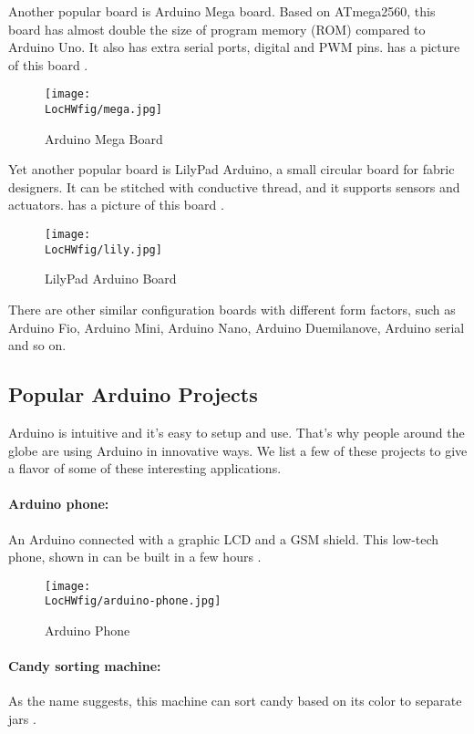 Another popular board is Arduino Mega board.  Based on
ATmega2560, this board has almost double the size of program
memory (ROM) compared to Arduino Uno.  It also has extra serial ports,
digital and PWM pins.   has a picture of this board
\cite{mega-ref}.
\begin{figure}
  \centering
  \texttt{[image: \\LocHWfig/mega.jpg]}
  \caption{Arduino Mega Board}
  \label{mega}
\end{figure}

Yet another popular board is LilyPad Arduino, a small circular
board for fabric designers. It can be stitched with conductive thread,
and it supports sensors and actuators.   has a picture of
this board \cite{lily-ref}.
\begin{figure}
  \centering
  \texttt{[image: \\LocHWfig/lily.jpg]}
  \caption{LilyPad Arduino Board}
  \label{lily}
\end{figure}

There are other similar configuration boards with different form
factors, such as Arduino Fio, Arduino Mini, Arduino Nano, Arduino
Duemilanove, Arduino serial and so on.

\subsection{Popular Arduino Projects}
Arduino is intuitive and it's easy to setup and use. That's why people around the globe
are using Arduino in innovative ways. We list a few of these projects to give a
flavor of some of these interesting applications.

\paragraph{Arduino phone:} An Arduino connected with a graphic LCD and a
GSM shield. This low-tech phone, shown in  can
be built in a few hours \cite{phone-ref}.
\begin{figure}
  \centering
  \texttt{[image: \\LocHWfig/arduino-phone.jpg]}
  \caption{Arduino Phone}
  \label{arduino-phone}
\end{figure}

\paragraph{Candy sorting machine:} As the name suggests, this machine
can sort candy based on its color to separate jars \cite{candy-ref}.

